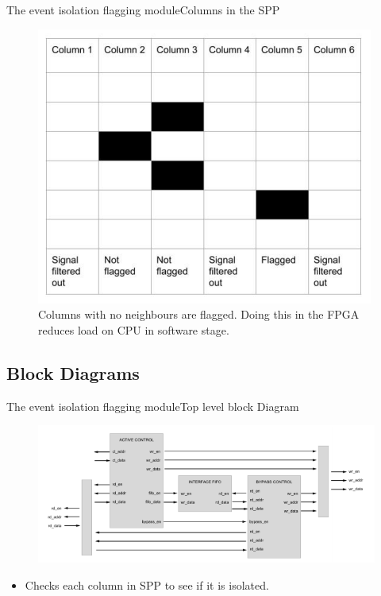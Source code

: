 \documentclass{beamer}
\begin{document}
\begin{frame}{The event isolation flagging module}{Columns in the SPP}
  \begin{figure}
    \includegraphics[scale=0.3]{Columns}
    \caption{\centering Columns with no neighbours are flagged. Doing this in the FPGA reduces load on CPU in software stage.}
  \end{figure}
\end{frame}

\subsection{Block Diagrams}

\begin{frame}{The event isolation flagging module}{Top level block Diagram}
  \begin{figure}
    \includegraphics[scale=0.4]{TopLevelBlock}
  \end{figure}
  \begin{itemize}
    \item
      Checks each column in SPP to see if it is isolated.
  \end{itemize}
\end{frame}
\end{document}
